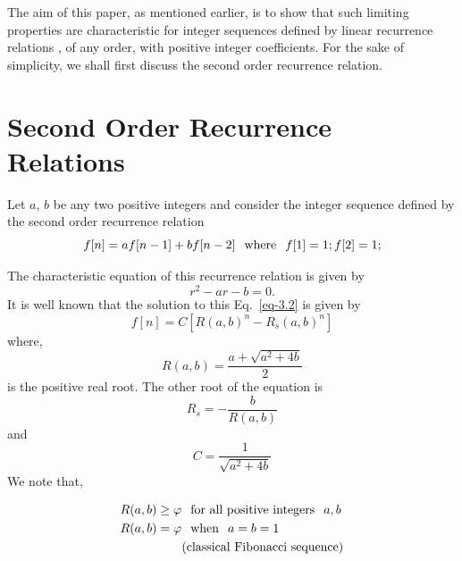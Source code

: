 \begin{multicols}{2}
The aim of this paper, as mentioned earlier, is to show that such limiting properties are characteristic for integer sequences defined by linear recurrence relations , of any order, with positive integer coefficients. For the sake of simplicity, we shall first discuss the second order recurrence relation. 
 
\vspace{-.2cm} 
 
\section{Second Order Recurrence\\ Relations}\label{section-3} 

\vspace{-.1cm} 

Let $a$, $b$ be any two positive integers and consider the integer sequence defined by the second order recurrence relation
\begin{equation}
f[n] = a f[n-1] + b f[n-2] \hspace{0.1in}  \textup{where} \hspace{0.1in}  f[1] = 1; f[2]= 1;\label{eq-3.1}
\end{equation}
 
The characteristic equation of this recurrence relation is given by
\begin{equation}
r^2 - ar - b = 0.\label{eq-3.2}
\end{equation}
It is well known that the solution to this Eq.~\eqref{eq-3.2} is given by
\begin{equation*}
f[n] =  C[R(a,b)^n - R_s(a,b)^n]
\end{equation*}
where, 
\begin{equation*}
R(a,b) = \displaystyle{\frac{a +\sqrt{a^2 + 4b}}{2}}
\end{equation*}
is the positive real root. The other root of the equation is 
\begin{equation*}
R_s = - \frac{b}{R(a,b)}
\end{equation*}
and 
\begin{equation*}
C = \displaystyle{\frac{1}{\sqrt{a^2 + 4b}}}
\end{equation*}
We note that,

\vspace{-.6cm}

\begin{align}
R(a,b) &\geq \varphi \hspace{0.1in} \textup{for all positive integers} \hspace{0.1in} a, b\label{eq-3.3}\\
R(a,b) &= \varphi   \hspace{0.1in}\textup{when}\hspace{0.1in} a = b = 1\label{eq-3.4}\\
       & \quad\quad \textup{(classical Fibonacci sequence)}\nonumber
\end{align}



\end{multicols}
